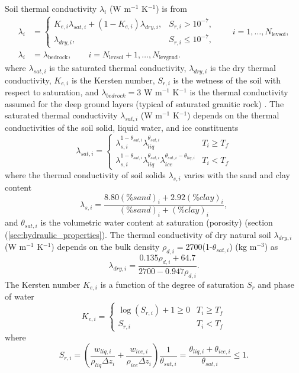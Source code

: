 \documentclass[12pt,authoryear]{elsarticle}
\numberwithin{equation}{section} %
\begin{document}
Soil thermal conductivity $\lambda_{i}$ (W m$^{-1}$ K$^{-1}$) is from \cite{faroukiThermalPropertiesSoils1981}
\begin{equation}
\begin{aligned}
\lambda_i &=
\begin{cases}
K_{e,i}\lambda_{sat,i} + (1-K_{e,i})\lambda_{dry,i}, & S_{r,i} > 10^{-7},\\
\lambda_{dry,i}, & S_{r,i} \leq 10^{-7},
\end{cases}
\qquad i=1,\ldots,N_{\mathrm{levsoi}},\\
\lambda_i &= \lambda_{\mathrm{bedrock}},
\qquad i=N_{\mathrm{levsoi}}+1,\ldots,N_{\mathrm{levgrnd}}.
\end{aligned}
\end{equation}
where $\lambda_{sat,i}$ is the saturated thermal conductivity, $\lambda_{dry,i}$ is the dry thermal conductivity, $K_{e,i}$ is the Kersten number, $S_{r,i}$ is the wetness of the soil with respect to saturation, and $\lambda_{bedrock}=$3 W m$^{-1}$ K$^{-1}$ is the thermal conductivity assumed for the deep ground layers (typical of saturated granitic rock)  \citep{clauserThermalConductivityRocks1995}. The saturated thermal conductivity $\lambda_{sat,i}$ (W m$^{-1}$ K$^{-1}$) depends on the thermal conductivities of the soil solid,
liquid water, and ice constituents
\begin{equation}
\lambda_{sat,i}=
\begin{cases}
\lambda_{s,i}^{1-\theta_{sat,i}}\lambda_{liq}^{\theta_{sat,i}} & T_{i} \geq T_{f} \\
\lambda_{s,i}^{1-\theta_{sat,i}}\lambda_{liq}^{\theta_{sat,i}}\lambda_{ice}^{\theta_{sat,i}-\theta_{liq,i}} & T_{i}<T_{f}
\end{cases}
\end{equation}
where the thermal conductivity of soil solids $\lambda_{s,i}$ varies with the sand and clay content
\begin{equation}
\lambda_{s,i} = \frac{8.80(\%sand)_{i}+2.92(\%clay)_{i}}{(\%sand)_{i}+(\%clay)_{i}},
\end{equation}
and $\theta_{sat,i}$ is the volumetric water content at saturation (porosity) (section (\ref{sec:hydraulic_properties}). The thermal conductivity of dry natural soil $\lambda_{dry,i}$ (W m$^{-1}$ K$^{-1}$) depends on the bulk density $\rho_{d,i}=$2700(1-$\theta_{sat,i}$) (kg m$^{-3}$) as
\begin{equation}
\lambda_{dry,i} = \frac{0.135\rho_{d,i}+64.7}{2700-0.947\rho_{d,i}}.
\end{equation}
The Kersten number $K_{e,i}$ is a function of the degree of saturation $S_{r}$ and phase of water
\begin{equation}
K_{e,i}=
\begin{cases}
\log(S_{r,i})+1\geq0 & T_{i} \geq T_{f} \\
S_{r,i} & T_{i}<T_{f}
\end{cases}
\end{equation}
where 
\begin{equation}
S_{r,i} = \left(\frac{w_{liq,i}}{\rho_{liq}\Delta z_{i}}+\frac{w_{ice,i}}{\rho_{ice}\Delta z_{i}}\right)\frac{1}{\theta_{sat,i}}=\frac{\theta_{liq,i}+\theta_{ice,i}}{\theta_{sat,i}} \leq 1.
\end{equation}
\end{document}
